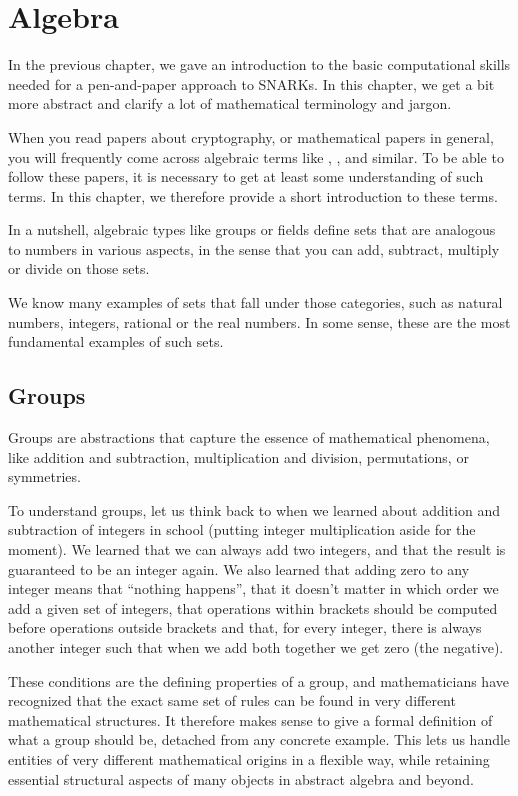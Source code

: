 \chapter{Algebra}

In the previous chapter, we gave an introduction to the basic computational skills needed for a pen-and-paper approach to SNARKs. In this chapter, we get a bit more abstract and clarify a lot of mathematical terminology and jargon.

When you read papers about cryptography, or mathematical papers in general, you will frequently come across algebraic terms like , ,  and similar. To be able to follow these papers, it is necessary to get at least some understanding of such terms. In this chapter, we therefore provide a short introduction to these terms.

In a nutshell, algebraic types like groups or fields define sets that are analogous to numbers in various aspects, in the sense that you can add, subtract, multiply or divide on those sets.

We know many examples of sets that fall under those categories, such as natural numbers, integers,  rational or the real numbers. In some sense, these are the most fundamental examples of such sets.

\section{Groups}\label{sec:groups}
 Groups are abstractions that capture the essence of mathematical phenomena, like addition and subtraction, multiplication and division, permutations, or symmetries.

To understand groups, let us think back to when we learned about addition and subtraction of integers in school (putting integer multiplication aside for the moment). We learned that we can always add two integers, and that the result is guaranteed to be an integer again. We also learned that adding zero to any integer means that ``nothing happens'', that it doesn't matter in which order we add a given set of integers, that operations within brackets should be computed before operations outside brackets and that, for every integer, there is always another integer  such that when we add both together we get zero (the negative).

These conditions are the defining properties of a group, and mathematicians have recognized that the exact same set of rules can be found in very different mathematical structures. It therefore makes sense to give a formal definition of what a group should be, detached from any concrete example. This lets us handle entities of very different mathematical origins in a flexible way, while retaining essential structural aspects of many objects in abstract algebra and beyond.

